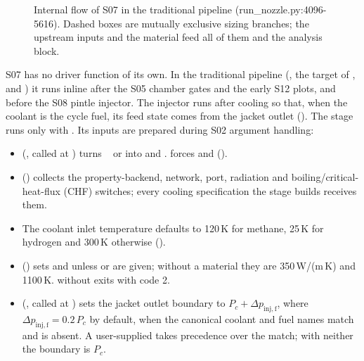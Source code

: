 \begin{figure}[!tp]
\caption{Internal flow of S07 in the traditional pipeline (run\_nozzle.py:4096-5616). Dashed boxes are mutually exclusive sizing branches; the upstream inputs and the material feed all of them and the analysis block.}
\label{fig:s07-flow}
\end{figure}

S07 has no driver function of its own. In the traditional pipeline (, the target of ,  and ) it runs inline after the S05 chamber gates and the early S12 plots, and before the S08 pintle injector. The injector runs after cooling so that, when the coolant is the cycle fuel, its feed state comes from the jacket outlet (). The stage runs only with . Its inputs are prepared during S02 argument handling:

\begin{itemize}
\item {} (, called at ) turns ~ or  into  and .  forces  and  ().
\item {} () collects the property-backend, network, port, radiation and boiling/critical-heat-flux (CHF) switches; every cooling specification the stage builds receives them.
\item The coolant inlet temperature defaults to 120\,K for methane, 25\,K for hydrogen and 300\,K otherwise ().
\item {} () sets  and  unless  or  are given; without a material they are 350\,W/(m\,K) and 1100\,K.  without  exits with code 2.
\item {} (, called at ) sets the jacket outlet boundary to $P_c + \Delta p_{\mathrm{inj,f}}$, where $\Delta p_{\mathrm{inj,f}} = 0.2\,P_c$ by default, when the canonical coolant and fuel names match and  is absent. A user-supplied  takes precedence over the match; with neither the boundary is $P_c$.
\end{itemize}

